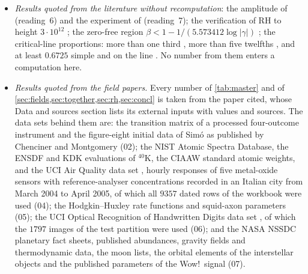 \documentclass[11pt]{article}
\theoremstyle{definition}\newtheorem{definition}[theorem]{Definition}
\theoremstyle{remark}\newtheorem{remark}[theorem]{Remark}
\begin{document}
\begin{itemize}
\item \emph{Results quoted from the literature without recomputation}: the amplitude of \cite{Remmen} (reading~6) and the experiment of \cite{Wei} (reading~7); the verification of RH to height $3\cdot10^{12}$ \cite{PT}; the zero-free region $\beta<1-1/(5.573412\log|\gamma|)$ \cite{MT}; the critical-line proportions: more than one third \cite{Levinson}, more than five twelfths \cite{PRZZ}, and at least $0.6725$ simple and on the line \cite{AF}. No number from them enters a computation here.
\item \emph{Results quoted from the field papers.} Every number of \cref{tab:master} and of \cref{sec:fields,sec:together,sec:rh,sec:concl} is taken from the paper cited, whose Data and sources section lists its external inputs with values and sources. The data sets behind them are: the transition matrix of a processed four-outcome instrument and the figure-eight initial data of Sim\'o as published by Chenciner and Montgomery (02); the NIST Atomic Spectra Database, the ENSDF and KDK evaluations of ${}^{40}$K, the CIAAW standard atomic weights, and the UCI Air Quality data set \cite{UCIair}, hourly responses of five metal-oxide sensors with reference-analyser concentrations recorded in an Italian city from March 2004 to April 2005, of which all $9357$ dated rows of the workbook were used (04); the Hodgkin--Huxley rate functions and squid-axon parameters (05); the UCI Optical Recognition of Handwritten Digits data set \cite{UCIdigits}, of which the $1797$ images of the test partition were used (06); and the NASA NSSDC planetary fact sheets, published abundances, gravity fields and thermodynamic data, the moon lists, the orbital elements of the interstellar objects and the published parameters of the Wow!\ signal (07).
\end{itemize}
\end{document}
